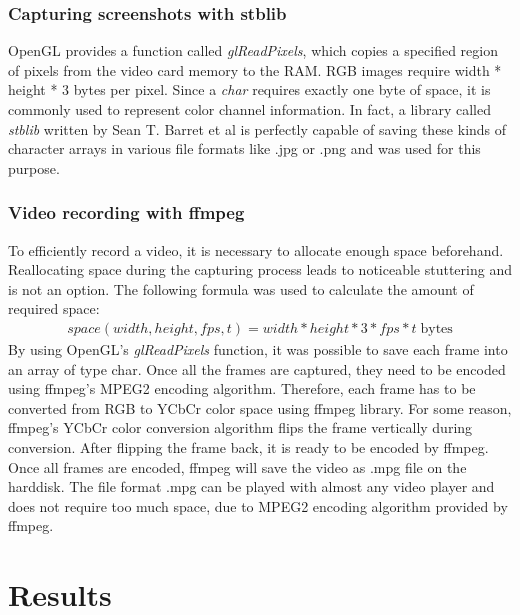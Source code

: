 \documentclass[11pt,a4paper,twoside,openright]{report}
\begin{document}
\subsection{Capturing screenshots with stblib}
OpenGL provides a function called \emph{glReadPixels}, which copies a specified region of pixels from the video card memory to the RAM. RGB images require width * height * 3 bytes per pixel. Since a \emph{char} requires exactly one byte of space, it is commonly used to represent color channel information. In fact, a library called \emph{stblib} written by Sean T. Barret et al is perfectly capable of saving these kinds of character arrays in various file formats like .jpg or .png and was used for this purpose.

\subsection{Video recording with ffmpeg}
To efficiently record a video, it is necessary to allocate enough space beforehand. Reallocating space during the capturing process leads to noticeable stuttering and is not an option. The following formula was used to calculate the amount of required space:
\begin{align*}
space(width, height, fps, t) = width * height * 3 * fps * t \; \mathrm{bytes}
\end{align*}
By using OpenGL's \emph{glReadPixels} function, it was possible to save each frame into an array of type char. Once all the frames are captured, they need to be encoded using ffmpeg's MPEG2 encoding algorithm. Therefore, each frame has to be converted from RGB to YCbCr color space using ffmpeg library. For some reason, ffmpeg's YCbCr color conversion algorithm flips the frame vertically during conversion. After flipping the frame back, it is ready to be encoded by ffmpeg. Once all frames are encoded, ffmpeg will save the video as .mpg file on the harddisk. The file format .mpg can be played with almost any video player and does not require too much space, due to MPEG2 encoding algorithm provided by ffmpeg.

\chapter{Results}
\label{sec:results}
\end{document}
